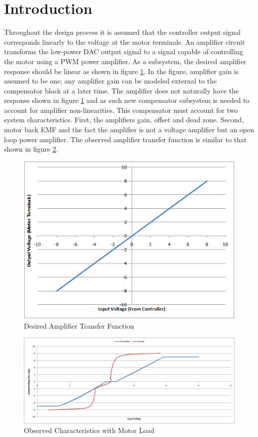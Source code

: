 \section{Introduction}
 

Throughout the design process it is assumed that the controller output signal corresponds linearly to the voltage at the motor terminals.
%
An amplifier circuit transforms the low-power DAC output signal to a signal capable of controlling the motor using a PWM power amplifier.
As a subsystem, the desired amplifier response should be linear as shown in figure \ref{fig:iodesired}.
In the figure, amplifier gain is assumed to be one; any amplifier gain can be modeled external to the compensator block at a later time.
The amplifier does not naturally %
have the response shown in figure \ref{fig:iodesired} and as such new compensator subsystem is needed to account for amplifier non-linearities.
This compensator must account for two system characteristics.
%
First, the amplifiers gain, offset and dead zone.
Second, motor back EMF and the fact %
the amplifier is not a voltage amplifier but an open loop power amplifier.
The observed amplifier transfer function is similar to that shown in figure \ref{fig:ioactual}.


\begin{figure}[ht]
    \centering
    \includegraphics[width=.60\textwidth]{images/InputVsOutputDesired.png}
    \caption{Desired Amplifier Transfer Function}
    \label{fig:iodesired}
\end{figure}

\begin{figure}[ht]
    \centering
    \includegraphics[width=.95\textwidth]{images/OutputVoltage.png}
    \caption{Observed Characteristics with Motor Load}
    \label{fig:ioactual}
\end{figure}